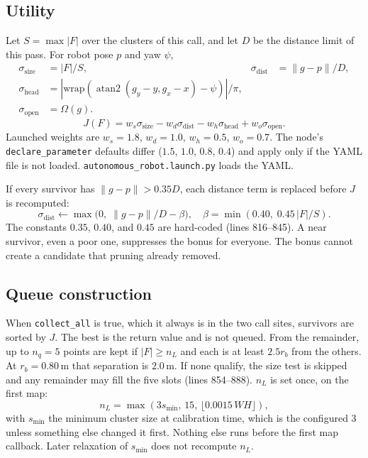 \documentclass[11pt]{article}
\begin{document}
\subsection{Utility}
Let $S=\max|F|$ over the clusters of this call, and let $D$ be the distance limit of this pass. For robot pose $p$ and yaw $\psi$,
\begin{align}
\sigma_{\mathrm{size}}&=|F|/S, &
\sigma_{\mathrm{dist}}&=\|g-p\|/D, \nonumber\\
\sigma_{\mathrm{head}}&=|\mathrm{wrap}(\operatorname{atan2}(g_y-y,g_x-x)-\psi)|/\pi, \nonumber\\
\sigma_{\mathrm{open}}&=\Omega(g).
\label{eq:terms}
\end{align}
\begin{equation}
J(F)= w_s\sigma_{\mathrm{size}}-w_d\sigma_{\mathrm{dist}}-w_h\sigma_{\mathrm{head}}+w_o\sigma_{\mathrm{open}}.
\label{eq:score}
\end{equation}
Launched weights are $w_s=1.8$, $w_d=1.0$, $w_h=0.5$, $w_o=0.7$. The node's \texttt{declare\_parameter} defaults differ ($1.5$, $1.0$, $0.8$, $0.4$) and apply only if the YAML file is not loaded. \texttt{autonomous\_robot.launch.py} loads the YAML.

If every survivor has $\|g-p\|>0.35D$, each distance term is replaced before $J$ is recomputed:
\begin{equation}
\sigma_{\mathrm{dist}}\leftarrow \max\big(0,\;\|g-p\|/D-\beta\big),
\quad
\beta=\min(0.40,\;0.45\,|F|/S).
\label{eq:far}
\end{equation}
The constants $0.35$, $0.40$, and $0.45$ are hard-coded (lines 816--845). A near survivor, even a poor one, suppresses the bonus for everyone. The bonus cannot create a candidate that pruning already removed.

\subsection{Queue construction}
When \texttt{collect\_all} is true, which it always is in the two call sites, survivors are sorted by $J$. The best is the return value and is not queued. From the remainder, up to $n_q=5$ points are kept if $|F|\ge n_L$ and each is at least $2.5 r_b$ from the others. At $r_b=0.80$\,m that separation is $2.0$\,m. If none qualify, the size test is skipped and any remainder may fill the five slots (lines 854--888). $n_L$ is set once, on the first map:
\begin{equation}
n_L=\max(3 s_{\min},\,15,\,\lfloor 0.0015\,WH\rfloor),
\label{eq:nl}
\end{equation}
with $s_{\min}$ the minimum cluster size at calibration time, which is the configured $3$ unless something else changed it first. Nothing else runs before the first map callback. Later relaxation of $s_{\min}$ does not recompute $n_L$.
\end{document}
